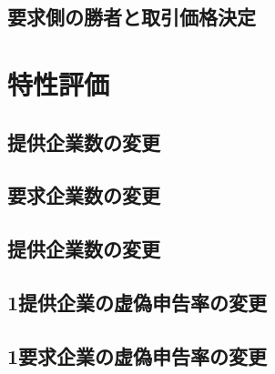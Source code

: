 \hypertarget{ux8981ux6c42ux5074ux306eux52ddux8005ux3068ux53d6ux5f15ux4fa1ux683cux6c7aux5b9a}{%
\subsection{要求側の勝者と取引価格決定}\label{ux8981ux6c42ux5074ux306eux52ddux8005ux3068ux53d6ux5f15ux4fa1ux683cux6c7aux5b9a}}

\hypertarget{ux7279ux6027ux8a55ux4fa1-1}{%
\section{特性評価}\label{ux7279ux6027ux8a55ux4fa1-1}}

\hypertarget{ux63d0ux4f9bux4f01ux696dux6570ux306eux5909ux66f4}{%
\subsection{提供企業数の変更}\label{ux63d0ux4f9bux4f01ux696dux6570ux306eux5909ux66f4}}

\hypertarget{ux8981ux6c42ux4f01ux696dux6570ux306eux5909ux66f4}{%
\subsection{要求企業数の変更}\label{ux8981ux6c42ux4f01ux696dux6570ux306eux5909ux66f4}}

\hypertarget{ux63d0ux4f9bux4f01ux696dux6570ux306eux5909ux66f4-1}{%
\subsection{提供企業数の変更}\label{ux63d0ux4f9bux4f01ux696dux6570ux306eux5909ux66f4-1}}

\hypertarget{ux63d0ux4f9bux4f01ux696dux306eux865aux507dux7533ux544aux7387ux306eux5909ux66f4-1}{%
\subsection{1提供企業の虚偽申告率の変更}\label{ux63d0ux4f9bux4f01ux696dux306eux865aux507dux7533ux544aux7387ux306eux5909ux66f4-1}}

\hypertarget{ux8981ux6c42ux4f01ux696dux306eux865aux507dux7533ux544aux7387ux306eux5909ux66f4-1}{%
\subsection{1要求企業の虚偽申告率の変更}\label{ux8981ux6c42ux4f01ux696dux306eux865aux507dux7533ux544aux7387ux306eux5909ux66f4-1}}

